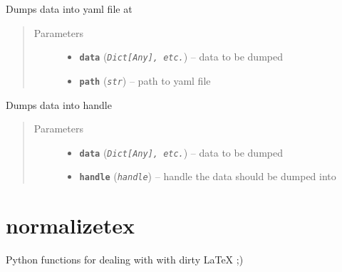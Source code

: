 \documentclass[letterpaper,10pt,english]{sphinxmanual}
\begin{document}

\begin{fulllineitems}
\label{modules/mrtools:listb.mrtools.yaml_dump}
Dumps data into yaml file at 
\begin{quote}\begin{description}
\item[{Parameters}] \leavevmode\begin{itemize}
\item {} 
\textbf{\texttt{data}} (\emph{\texttt{Dict{[}Any{]}, etc.}}) -- data to be dumped

\item {} 
\textbf{\texttt{path}} (\emph{\texttt{str}}) -- path to yaml file

\end{itemize}

\end{description}\end{quote}

\end{fulllineitems}


\begin{fulllineitems}
\label{modules/mrtools:listb.mrtools.yaml_dumps}
Dumps data into handle
\begin{quote}\begin{description}
\item[{Parameters}] \leavevmode\begin{itemize}
\item {} 
\textbf{\texttt{data}} (\emph{\texttt{Dict{[}Any{]}, etc.}}) -- data to be dumped

\item {} 
\textbf{\texttt{handle}} (\emph{\texttt{handle}}) -- handle the data should be dumped into

\end{itemize}

\end{description}\end{quote}

\end{fulllineitems}



\section{normalizetex}
\label{modules/normalizetex:module-listb.normalizetex}\label{modules/normalizetex:normalizetex}\label{modules/normalizetex::doc}
Python functions for dealing with with dirty LaTeX ;)
\end{document}

